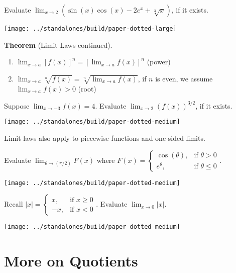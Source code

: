 \documentclass[../main.tex]{subfiles}
\begin{document}
\begin{example}
  Evaluate \(\lim_{x \to 2} \left(\sin(x)\cos(x) - 2 e^{x} + \sqrt[3]{x}\right)\), if it exists.
\end{example}
\texttt{[image: ../standalones/build/paper-dotted-large]}
\clearpage

\begin{mdframed}[style=withref]
  \textbf{Theorem} (Limit Laws continued).
  \begin{enumerate}[label=(\arabic*), start=6]
    \item \(\lim_{x \to a} [f(x)]^{n} = \left[ \lim_{x \to a} f(x) \right]^{n}\) \hfill (power)
    \item \(\lim_{x \to a} \sqrt[n]{f(x)} = \sqrt[n]{\lim_{x \to a} f(x)}\), \quad if \(n\) is even, we assume {\(\lim_{x \to a} f(x) > 0\)} \hfill (root)
  \end{enumerate}

\end{mdframed}

\begin{example}
  Suppose \(\lim_{x \to -3}f(x) = 4\). Evaluate \(\lim_{x \to 2} (f(x))^{3/2}\), if it exists.
\end{example}
\texttt{[image: ../standalones/build/paper-dotted-medium]}

\faLightbulb{} Limit laws also apply to piecewise functions and one-sided limits.
\begin{example}
  Evaluate \(\lim_{\theta \to (\pi/2)} F(x)\) where \(F(x) = \begin{cases} \cos(\theta), & \text{if } \theta > 0 \\ e^{\theta}, &\text{if } \theta \le 0 \end{cases}\).
\end{example}
\texttt{[image: ../standalones/build/paper-dotted-medium]}
\begin{example}
  Recall \(|x| = \begin{cases} x, &\text{if } x \ge 0 \\ -x, &\text{if } x < 0 \end{cases}\). Evaluate \(\lim_{x \to 0} |x|\).
\end{example}
\texttt{[image: ../standalones/build/paper-dotted-medium]}
\clearpage

\section{More on Quotients}\label{sec:quotients}
\end{document}
